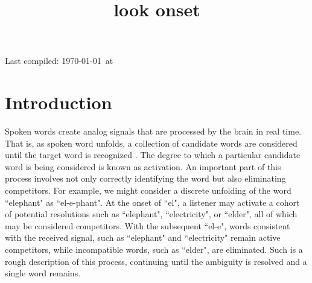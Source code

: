\documentclass{article}
\title{look onset}
\date{}
\begin{document}

\maketitle

Last compiled: \today \  at \currenttime

%




\section{Introduction}


Spoken words create analog signals that are processed by the brain in real time. That is, as spoken word unfolds, a collection of candidate words are considered until the target word is recognized \citep{MarslenWilson1987}. The degree to which a particular candidate word is being considered is known as activation. An important part of this process involves not only correctly identifying the word but also eliminating competitors. For example, we might consider a discrete unfolding of the word ``elephant" as ``el-e-phant". At the onset of ``el", a listener may activate a cohort of potential resolutions such as ``elephant", ``electricity", or ``elder", all of which may be considered competitors. With the subsequent ``el-e", words consistent with the received signal, such as ``elephant" and ``electricity" remain active competitors, while incompatible words, such as ``elder", are eliminated. Such is a rough description of this process, continuing until the ambiguity is resolved and a single word remains.
\end{document}
